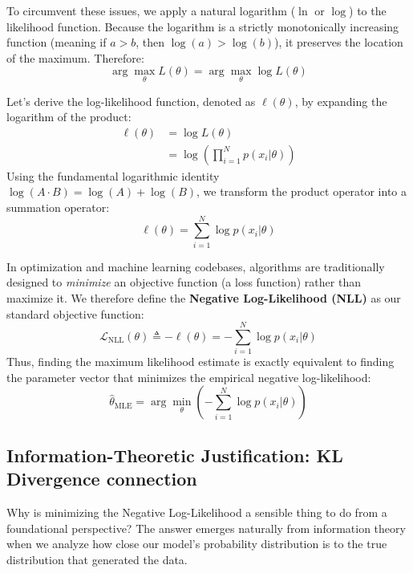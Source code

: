 \documentclass{article}
\begin{document}
To circumvent these issues, we apply a natural logarithm ($\ln$ or $\log$) to the likelihood function. Because the logarithm is a strictly monotonically increasing function (meaning if $a > b$, then $\log(a) > \log(b)$), it preserves the location of the maximum. Therefore:
\begin{equation}
\arg\max_{\theta} L(\theta) = \arg\max_{\theta} \log L(\theta)
\end{equation}

Let's derive the log-likelihood function, denoted as $\ell(\theta)$, by expanding the logarithm of the product:
\begin{align*}
\ell(\theta) &= \log L(\theta) \\
&= \log \left( \prod_{i=1}^N p(x_i|\theta) \right)
\end{align*}
Using the fundamental logarithmic identity $\log(A \cdot B) = \log(A) + \log(B)$, we transform the product operator into a summation operator:
\begin{equation}
\ell(\theta) = \sum_{i=1}^N \log p(x_i|\theta)
\end{equation}

In optimization and machine learning codebases, algorithms are traditionally designed to \textit{minimize} an objective function (a loss function) rather than maximize it. We therefore define the \textbf{Negative Log-Likelihood (NLL)} as our standard objective function:
\begin{equation}
\mathcal{L}_{\text{NLL}}(\theta) \triangleq -\ell(\theta) = -\sum_{i=1}^N \log p(x_i|\theta)
\end{equation}
Thus, finding the maximum likelihood estimate is exactly equivalent to finding the parameter vector that minimizes the empirical negative log-likelihood:
\begin{equation}
\hat{\theta}_{\text{MLE}} = \arg\min_{\theta} \left( -\sum_{i=1}^N \log p(x_i|\theta) \right)
\end{equation}



\subsection{Information-Theoretic Justification: KL Divergence connection}

Why is minimizing the Negative Log-Likelihood a sensible thing to do from a foundational perspective? The answer emerges naturally from information theory when we analyze how close our model's probability distribution is to the true distribution that generated the data.
\end{document}
